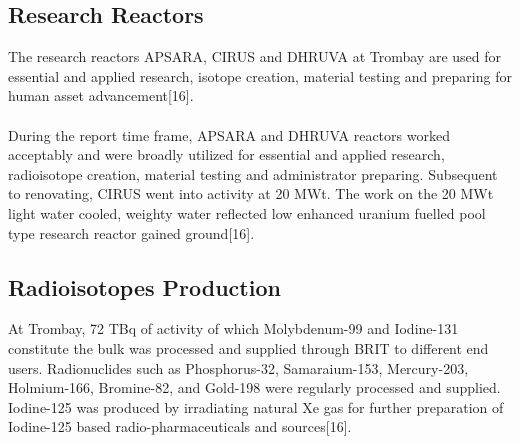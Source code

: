 \documentclass[12pt]{article}
\begin{document}
\subsection{Research Reactors}
The research reactors APSARA, CIRUS and DHRUVA at Trombay are used for essential and applied research, isotope creation, material testing and preparing for human asset advancement[16].
\\
\\
During the report time frame, APSARA and DHRUVA reactors worked acceptably and were broadly utilized for essential and applied research, radioisotope creation, material testing and administrator preparing. Subsequent to renovating, CIRUS went into activity at 20 MWt. The work on the 20 MWt light water cooled, weighty water reflected low enhanced uranium fuelled pool type research reactor gained ground[16].
\subsection{Radioisotopes Production}
At Trombay, 72 TBq of activity of which Molybdenum-99 and Iodine-131 constitute the bulk was processed and supplied through BRIT to different end users. Radionuclides such as Phosphorus-32, Samaraium-153, Mercury-203, Holmium-166, Bromine-82, and Gold-198 were regularly processed and supplied. Iodine-125 was produced by irradiating natural Xe gas for further preparation of Iodine-125 based radio-pharmaceuticals and sources[16].
\end{document}
